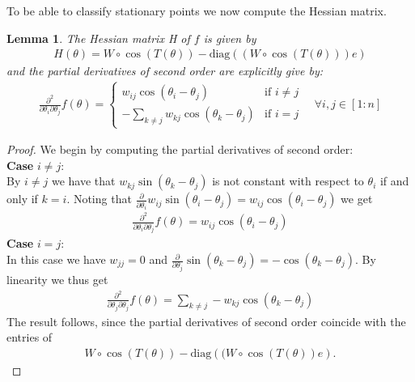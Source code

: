 \documentclass[12pt,a4paper]{article}
\theoremstyle{mythm}
\newtheorem{lem}[thm]{Lemma}
\begin{document}
To be able to classify stationary points we now compute the Hessian matrix.
\begin{lem}
The Hessian matrix H of $ f $ is given by 
\begin{align}
\label{def:Hessian} 
H(\theta) = W \circ \cos( T(\theta) ) - \text{diag} \left(  \left( W \circ \cos( T (\theta) ) \right) e  \right) 
\end{align} 
and the partial derivatives of second order are explicitly give by:
\begin{align*}
\frac{ \partial ^{ 2 }  }{ \partial \theta_i \partial \theta_j } f(\theta) = \begin{cases}
w _{ij} \cos( \theta_i - \theta_j )  & \text{if } i \neq j \\
- \sum_{ k \neq j  }^{ }w _{ kj } \cos( \theta_k - \theta_j )   & \text{if } i =j 
\end{cases}
\quad \forall i,j \in \left[ 1:n \right] 
\end{align*} 
\end{lem} 
\begin{proof}
We begin by computing the partial derivatives of second order: \\
\textbf{Case}  $ i \neq j$: \\
By $ i \neq j  $ we have that $ w _{ kj } \sin( \theta_k - \theta_j  )  $ is not constant with respect to $ \theta_i $ if and only if $ k = i $. Noting that $ \frac{ \partial
}{ \partial \theta_i } w _{ ij } \sin( \theta_i - \theta_j ) = w _{ ij } \cos( \theta_i - \theta_j )   $ we get
\begin{align*}
\frac{ \partial ^{ 2 }  }{ \partial \theta_i \partial \theta_j } f (\theta) = w _{ ij } \cos( \theta_i - \theta_j ) 
\end{align*} 
\textbf{Case}  $ i = j $: \\
In this case we have $ w _{ jj } = 0 $ and $ \frac{ \partial  }{ \partial \theta_j } \sin( \theta_k - \theta_j  ) = - \cos( \theta_k - \theta_j ) $. By linearity we thus get
\begin{align*}
\frac{ \partial ^{ 2 }  }{ \partial \theta_j \partial \theta_j } f(\theta) = \sum_{ k \neq j   }^{  } -w _{ kj } \cos( \theta_k - \theta_j ) 
\end{align*} 
The result follows, since the partial derivatives of second order coincide with the entries of 
\begin{align*}
W \circ \cos( T ( \theta) ) - \text{diag} \left( ( W \circ \cos( T ( \theta) ) e \right).
\end{align*}
\end{proof}
\end{document}
